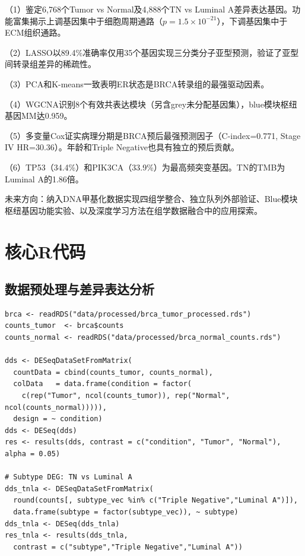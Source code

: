 \documentclass[12pt,a4paper,openany]{ctexbook}
\begin{document}
（1）鉴定6,768个Tumor vs Normal及4,888个TN vs Luminal A差异表达基因。功能富集揭示上调基因集中于细胞周期通路（$p=1.5\times10^{-21}$），下调基因集中于ECM组织通路。

（2）LASSO以89.4\%准确率仅用35个基因实现三分类分子亚型预测，验证了亚型间转录组差异的稀疏性。

（3）PCA和K-means一致表明ER状态是BRCA转录组的最强驱动因素。

（4）WGCNA识别8个有效共表达模块（另含grey未分配基因集），blue模块枢纽基因MM达0.959。

（5）多变量Cox证实病理分期是BRCA预后最强预测因子（C-index=0.771, Stage IV HR=30.36）。年龄和Triple Negative也具有独立的预后贡献。

（6）TP53（34.4\%）和PIK3CA（33.9\%）为最高频突变基因。TN的TMB为Luminal A的1.86倍。

未来方向：纳入DNA甲基化数据实现四组学整合、独立队列外部验证、Blue模块枢纽基因功能实验、以及深度学习方法在组学数据融合中的应用探索。

\printbibliography

\newpage
\appendix
\chapter{核心R代码}

\section{数据预处理与差异表达分析}
\begin{lstlisting}[caption={mRNA预处理与DESeq2差异表达}, basicstyle=\ttfamily\scriptsize]
brca <- readRDS("data/processed/brca_tumor_processed.rds")
counts_tumor  <- brca$counts
counts_normal <- readRDS("data/processed/brca_normal_counts.rds")

dds <- DESeqDataSetFromMatrix(
  countData = cbind(counts_tumor, counts_normal),
  colData   = data.frame(condition = factor(
    c(rep("Tumor", ncol(counts_tumor)), rep("Normal", ncol(counts_normal))))),
  design = ~ condition)
dds <- DESeq(dds)
res <- results(dds, contrast = c("condition", "Tumor", "Normal"), alpha = 0.05)

# Subtype DEG: TN vs Luminal A
dds_tnla <- DESeqDataSetFromMatrix(
  round(counts[, subtype_vec %in% c("Triple Negative","Luminal A")]),
  data.frame(subtype = factor(subtype_vec)), ~ subtype)
dds_tnla <- DESeq(dds_tnla)
res_tnla <- results(dds_tnla,
  contrast = c("subtype","Triple Negative","Luminal A"))
\end{lstlisting}
\end{document}
